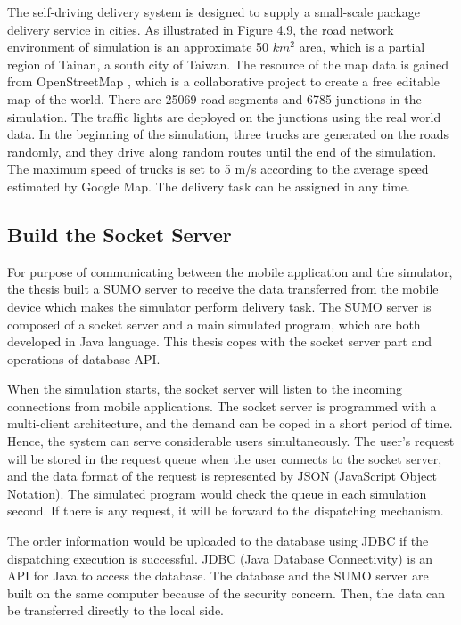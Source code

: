 \documentclass[12pt]{ksthesis}
\begin{document}
\begin{thesis}
{The self-driving delivery system is designed to supply a small-scale package delivery service in cities. As illustrated in Figure 4.9, the road network environment of simulation is an approximate 50 $km^{2}$  area, which is a partial region of Tainan, a south city of Taiwan. The resource of the map data is gained from OpenStreetMap \cite{Haklay2008}, which is a collaborative project to create a free editable map of the world. There are 25069 road segments and 6785 junctions in the simulation. The traffic lights are deployed on the junctions using the real world data. In the beginning of the simulation, three trucks are generated on the roads randomly, and they drive along random routes until the end of the simulation. The maximum speed of trucks is set to 5 m/s according to the average speed estimated by Google Map. The delivery task can be assigned in any time.


\subsection{Build the Socket Server}
For purpose of communicating between the mobile application and the simulator, the thesis built a SUMO server to receive the data transferred from the mobile device which makes the simulator perform delivery task. The SUMO server is composed of a socket server and a main simulated program, which are both developed in Java language. This thesis copes with the socket server part and operations of database API.

When the simulation starts, the socket server will listen to the incoming connections from mobile applications. The socket server is programmed with a multi-client architecture, and the demand can be coped in a short period of time. Hence, the system can serve considerable users simultaneously. The user’s request will be stored in the request queue when the user connects to the socket server, and the data format of the request is represented by JSON (JavaScript Object Notation). The simulated program would check the queue in each simulation second. If there is any request, it will be forward to the dispatching mechanism. 

The order information would be uploaded to the database using JDBC if the dispatching execution is successful. JDBC (Java Database Connectivity) is an API for Java to access the database. The database and the SUMO server are built on the same computer because of the security concern. Then, the data can be transferred directly to the local side. 

}
\end{thesis}
\end{document}
